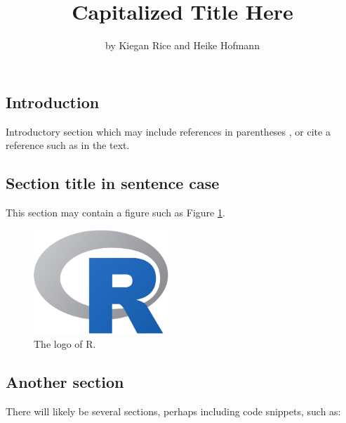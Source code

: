 \title{Capitalized Title Here}
\author{by Kiegan Rice and Heike Hofmann}

\maketitle


\hypertarget{introduction}{%
\subsection{Introduction}\label{introduction}}

Introductory section which may include references in parentheses
\citep{R}, or cite a reference such as \citet{R} in the text.

\hypertarget{section-title-in-sentence-case}{%
\subsection{Section title in sentence
case}\label{section-title-in-sentence-case}}

This section may contain a figure such as Figure \ref{fig:Rlogo}.

\begin{Schunk}
\begin{figure}[htbp]

{\centering \includegraphics[width=2in]{Rlogo} 

}

\caption[The logo of R]{The logo of R.}\label{fig:Rlogo}
\end{figure}
\end{Schunk}

\hypertarget{another-section}{%
\subsection{Another section}\label{another-section}}

There will likely be several sections, perhaps including code snippets,
such as:

